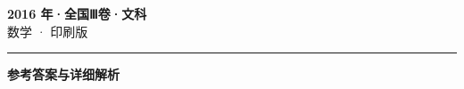 \documentclass[zihao=5, a4paper]{ctexart}
\begin{document}
\begin{center}
  {\Large\bfseries 2016 年·全国Ⅲ卷·文科}\\[4pt]
  {\large 数学 · 印刷版}
\end{center}
\medskip
{}

\par\bigskip\hrule\bigskip
{}
\begin{center}{\large\bfseries 参考答案与详细解析}\end{center}
\smallskip

\end{document}
